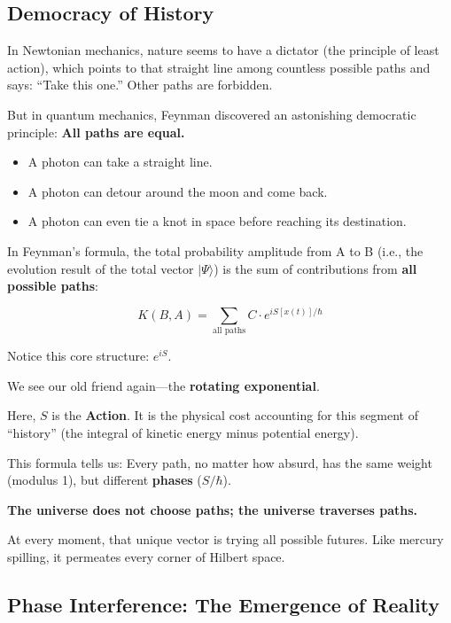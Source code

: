 \documentclass[11pt,a4paper,twoside]{book}
\begin{document}
\subsection{Democracy of History}

In Newtonian mechanics, nature seems to have a dictator (the principle of least action), which points to that straight line among countless possible paths and says: ``Take this one.'' Other paths are forbidden.

But in quantum mechanics, Feynman discovered an astonishing democratic principle: \textbf{All paths are equal.}

\begin{itemize}
\item A photon can take a straight line.

\item A photon can detour around the moon and come back.

\item A photon can even tie a knot in space before reaching its destination.
\end{itemize}

In Feynman's formula, the total probability amplitude from A to B (i.e., the evolution result of the total vector $|\Psi\rangle$) is the sum of contributions from \textbf{all possible paths}:

$$K(B, A) = \sum_{\text{all paths}} C \cdot e^{iS[x(t)]/\hbar}$$

Notice this core structure: \textbf{$e^{iS}$}.

We see our old friend again---the \textbf{rotating exponential}.

Here, $S$ is the \textbf{Action}. It is the physical cost accounting for this segment of ``history'' (the integral of kinetic energy minus potential energy).

This formula tells us: Every path, no matter how absurd, has the same weight (modulus 1), but different \textbf{phases} ($S/\hbar$).

\textbf{The universe does not choose paths; the universe traverses paths.}

At every moment, that unique vector is trying all possible futures. Like mercury spilling, it permeates every corner of Hilbert space.

\subsection{Phase Interference: The Emergence of Reality}
\end{document}

